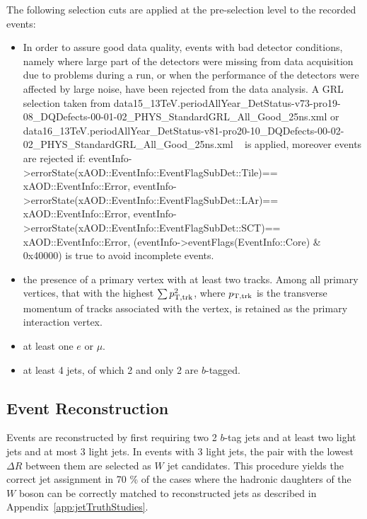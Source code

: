 The following selection cuts are applied at the pre-selection level to the recorded events:
\begin{itemize}
\item In order to assure good data quality, events with bad detector
  conditions, namely where large part of the detectors were missing
  from data acquisition due to problems during a run, or when the
  performance of the detectors were affected by large noise, have been
  rejected from the data analysis. A GRL selection taken from
       data15\_13TeV.periodAllYear\_DetStatus-v73-pro19-08\_DQDefects-00-01-02\_PHYS\_StandardGRL\_All\_Good\_25ns.xml
       or data16\_13TeV.periodAllYear\_DetStatus-v81-pro20-10\_DQDefects-00-02-02\_PHYS\_StandardGRL\_All\_Good\_25ns.xml
   ~\cite{GRL}       is applied, moreover events are rejected if:
       eventInfo->errorState(xAOD::EventInfo::EventFlagSubDet::Tile)==
       xAOD::EventInfo::Error,
       eventInfo->errorState(xAOD::EventInfo::EventFlagSubDet::LAr)== 
xAOD::EventInfo::Error,
eventInfo->errorState(xAOD::EventInfo::EventFlagSubDet::SCT)== 
xAOD::EventInfo::Error, (eventInfo->eventFlags(EventInfo::Core) \& 0x40000) is true to
	avoid incomplete events.
 
\item the presence of a  primary vertex with at least two
  tracks. Among all primary vertices, that with the highest
	 $\sum p_{{\rm T,trk}}^{2}$, where
	$p_{{\rm T,trk}}$ is the transverse momentum of tracks
	associated with the vertex, is retained as the primary
        interaction vertex.
\item at least one $e$ or $\mu$.
\item at least 4 jets, of which  2 and only 2 are $b$-tagged.
\end{itemize}


\subsection{Event Reconstruction}
Events are reconstructed by first requiring two 2 $b$-tag jets and at least two light
jets and at most 3 light jets. In events with 3 light jets, the pair with the 
lowest $\Delta R$ between them are selected as $W$ jet candidates. This
procedure yields the correct jet assignment in 70 \% of the cases where the
hadronic daughters of the $W$ boson can be correctly matched to reconstructed
jets as described in Appendix~\ref{app:jetTruthStudies}.


